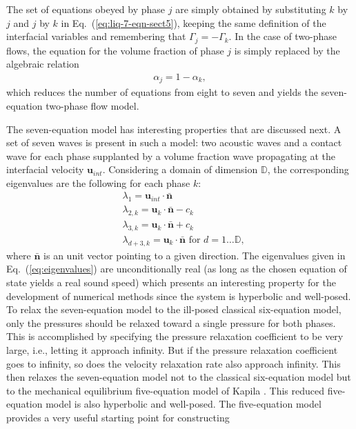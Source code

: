 \documentclass[preprint,10pt]{elsarticle}
\newcommand{\mbold}[1]{\boldsymbol#1}
\newcommand{\eqt}[1]{Eq.~(\ref{#1})}                     %
\begin{document}
The set of equations obeyed by phase $j$ are simply obtained by substituting $k$ by $j$ and $j$ by $k$ in \eqt{eq:liq-7-eqn-sect5}, keeping the same definition of the interfacial variables and remembering that $\Gamma_j = - \Gamma_k$. In the case of two-phase flows, the equation for the volume fraction of phase $j$ is simply replaced by the algebraic relation
%
\begin{align}
 \alpha_{j}= 1 - \alpha_{k}, \nonumber
\end{align}
%
which reduces the number of equations from eight to seven and yields the seven-equation two-phase flow model. 

The seven-equation model has interesting properties that are discussed next. A set of seven waves is present in such a model: two acoustic waves and a contact wave for each phase supplanted by a volume fraction wave propagating at the interfacial velocity $\mbold u_{int}$. Considering a domain of dimension $\mathbb{D}$, the corresponding eigenvalues are the following for each phase $k$:
% 
\begin{align}\label{eq:eigenvalues}
&\lambda_1 = \mbold u_{int} \cdot \bar{\mbold n} \nonumber\\
&\lambda_{2,k} = \mbold u_k \cdot \bar{\mbold n} - c_k \nonumber\\
&\lambda_{3,k} = \mbold u_k \cdot \bar{\mbold n} + c_k \\
&\lambda_{d+3,k} = \mbold u_k \cdot \bar{\mbold n} \text{ for } d = 1 \dots \mathbb{D},\nonumber
\end{align}
%
where $\bar{\mbold n}$ is an unit vector pointing to a given direction. The eigenvalues given in \eqt{eq:eigenvalues} are unconditionally real (as long as the chosen equation of state yields a real sound speed) which presents an interesting property for the development of numerical methods since the system is hyperbolic and well-posed. To relax the seven-equation model to
the ill-posed classical six-equation model, only the pressures should be
relaxed toward a single pressure for both phases.  This is
accomplished by specifying the pressure relaxation coefficient to be
very large, i.e., letting it approach infinity.  But if the pressure
relaxation coefficient goes to infinity, so does the velocity
relaxation rate also approach infinity.  This then relaxes the
seven-equation model not to the classical six-equation model but to the
mechanical equilibrium five-equation model of Kapila \cite{Kapila_2001}.  This reduced
five-equation model is also hyperbolic and well-posed. The five-equation
model provides a very useful starting point for constructing
\end{document}
